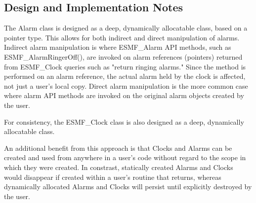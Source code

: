 
\subsection{Design and Implementation Notes}

The Alarm class is designed as a deep, dynamically allocatable class,
based on a pointer type.  This allows for both indirect and direct
manipulation of alarms.  Indirect alarm manipulation is where ESMF\_Alarm API
methods, such as ESMF\_AlarmRingerOff(), are invoked on alarm references
(pointers) returned from ESMF\_Clock queries such as "return ringing alarms."
Since the method is performed on an alarm reference, the actual alarm held
by the clock is affected, not just a user's local copy.  Direct alarm
manipulation is the more common case where alarm API methods are invoked on
the original alarm objects created by the user.

For consistency, the ESMF\_Clock class is also designed as a deep, dynamically
allocatable class. 

An additional benefit from this approach is that Clocks and Alarms can be
created and used from anywhere in a user's code without regard to the scope
in which they were created.  In constrast, statically created Alarms and
Clocks would disappear if created within a user's routine that returns,
whereas dynamically allocated Alarms and Clocks will persist until explicitly
destroyed by the user.
